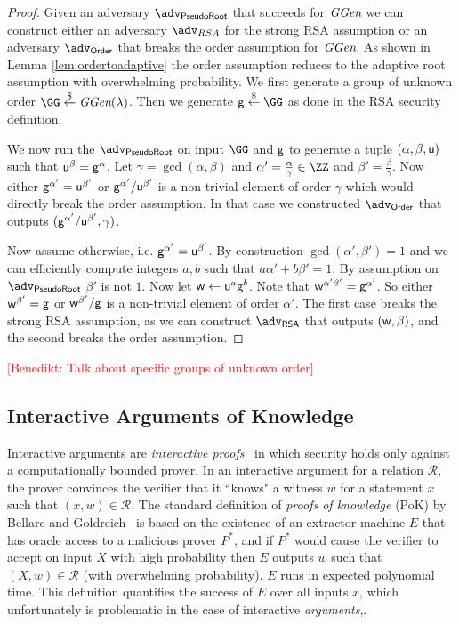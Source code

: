 \documentclass{article}
\theoremstyle{definition}
\newcommand{\benedikt}[1]{{\textcolor{red}{[Benedikt: #1]}}}
\newcommand{\benedikt}[1]{}
\begin{document}
\begin{proof}
	Given an adversary $\adv_{\textsf{PseudoRoot}}$ that succeeds for $\textit{GGen}$ we can construct either an adversary $\adv_{RSA}$ for the strong RSA assumption or an adversary $\adv_{\textsf{Order}}$ that breaks the order assumption for $\textit{GGen}$. As shown in Lemma \ref{lem:ordertoadaptive} the order assumption reduces to the adaptive root assumption with overwhelming probability. 
	We first generate a group of unknown order $\GG \sample \ggen(\lambda)$.
	Then we generate $\gr{g}\sample \GG$ as done in the \textsf{RSA} security definition.
	
	We now run the $\adv_{\textsf{PseudoRoot}}$ on input $\GG$ and $\mathsf{g}$ to generate a tuple $(\alpha,\beta,\mathsf{u})$ such that $\mathsf{u}^{\beta}=\mathsf{g}^{\alpha}$. Let $\gamma=\gcd(\alpha,\beta)$ and $\alpha'=\frac{\alpha}{\gamma}\in \ZZ$ and  $\beta'=\frac{\beta}{\gamma}$. Now either $\mathsf{g}^{\alpha'}=\mathsf{u}^{\beta'}$ or $\mathsf{g}^{\alpha'}/\mathsf{u}^{\beta'}$ is a non trivial element of order $\gamma$ which would directly break the order assumption. In that case we constructed $\adv_{\textsf{Order}}$ that outputs $(\mathsf{g}^{\alpha'}/\mathsf{u}^{\beta'},\gamma)$.
	
	Now assume otherwise, i.e. $\mathsf{g}^{\alpha'}=\mathsf{u}^{\beta'}$. By construction $\gcd(\alpha',\beta')=1$ and we can efficiently compute integers $a,b$ such that $a \alpha'+b \beta'=1$. By assumption on $\adv_{\textsf{PseudoRoot}}$ $\beta'$ is not $1$. Now let $\mathsf{w}\gets \mathsf{u}^{a}\mathsf{g}^{b}$. Note that $\mathsf{w}^{\alpha'\beta'}=\mathsf{g}^{\alpha'}$. So either $\mathsf{w}^{\beta'}=\mathsf{g}$ or $\mathsf{w}^{\beta'}/\mathsf{g}$ is a non-trivial element of order $\alpha'$. The first case breaks the strong RSA assumption, as we can construct $\adv_{\textsf{RSA}}$ that outputs $(\mathsf{w},\beta)$, and the second breaks the order assumption.
\end{proof}


\benedikt{Talk about specific groups of unknown order}

\subsection{Interactive Arguments of Knowledge}
Interactive arguments are \emph{interactive proofs}~\cite{GolMicRac89} in which security holds only against a computationally bounded prover. In an interactive argument for a relation $\mathcal{R}$, the prover convinces the verifier that it ``knows" a witness $w$ for a statement $x$ such that $(x, w) \in \mathcal{R}$. The standard definition of \emph{proofs of knowledge} (PoK) by Bellare and Goldreich~\cite{C:BelGol92} is based on the existence of an extractor machine $E$ that has oracle access to a malicious prover $P^*$, and if $P^*$ would cause the verifier to accept on input $X$ with high probability then $E$ outputs $w$ such that $(X, w) \in \mathcal{R}$ (with overwhelming probability). $E$ runs in expected polynomial time. This definition quantifies the success of $E$ over all inputs $x$, which unfortunately is problematic in the case of interactive  \emph{arguments},.
\end{document}
